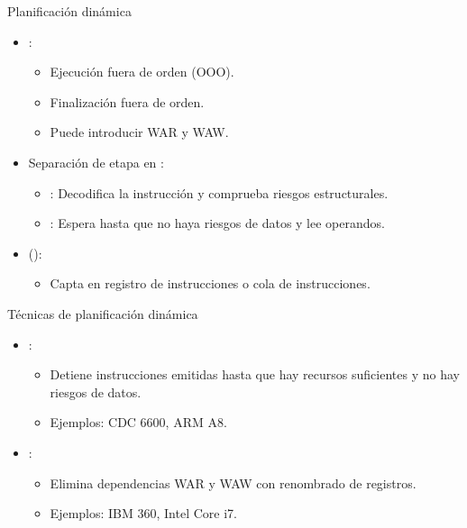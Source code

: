 \begin{frame}[t]{Planificación dinámica}
\begin{itemize}
  \item {}:
    \begin{itemize}
      \item Ejecución fuera de orden (OOO).
      \item Finalización fuera de orden.
      \item Puede introducir  WAR y WAW.
    \end{itemize}

  \item Separación de etapa  en :
    \begin{itemize}
      \item {}: Decodifica la instrucción y comprueba riesgos estructurales.
      \item {}: Espera hasta que no haya riesgos de datos y lee operandos.
    \end{itemize}

  \item {} ():
    \begin{itemize}
      \item Capta en registro de instrucciones o cola de instrucciones.
    \end{itemize}
\end{itemize}
\end{frame}

\begin{frame}[t]{Técnicas de planificación dinámica}
\begin{itemize}
  \item {}:
    \begin{itemize}
      \item Detiene instrucciones emitidas hasta que hay recursos suficientes y no hay riesgos de datos.
      \item Ejemplos: CDC 6600, ARM A8.
    \end{itemize}

  \item {}:
    \begin{itemize}
      \item Elimina dependencias WAR y WAW con renombrado de registros.
      \item Ejemplos: IBM 360, Intel Core i7.
    \end{itemize}
\end{itemize}
\end{frame}
